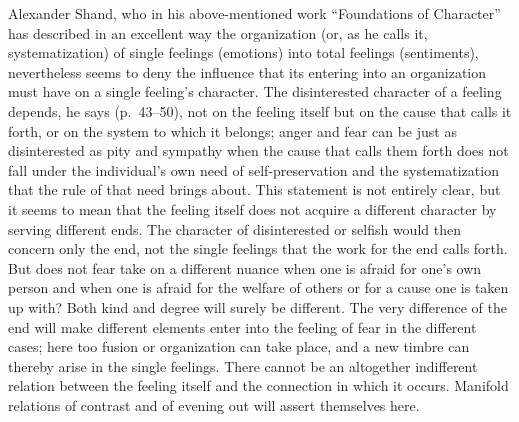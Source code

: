 \documentclass[12pt]{book}
\newcommand{\opage}[1]{\marginnote{\footnotesize\textit{[#1]}}}
\begin{document}
Alexander Shand, who in his above-mentioned work ``Foundations of Character'' has
described in an excellent way the organization (or, as he calls it,
systematization) of single feelings (emotions) into total feelings (sentiments),
nevertheless seems to deny the influence that its entering into an organization
must have on a single feeling's character. The disinterested character of a
feeling depends, he says (p.~43--50), not on the feeling itself but on the cause
that calls it forth, or on the system to which it belongs; anger and fear can be
just as disinterested as pity and sympathy when the cause that calls them forth
does not fall under the individual's own need of self-preservation and the
systematization that the rule of that need brings about. This statement is not
entirely clear, but it seems to mean that the feeling itself does not acquire a
different character by serving different ends. The character of disinterested or
selfish would then concern only the end, not the single feelings that the work
for the end calls forth. But does not fear take on a different \opage{32}nuance
when one is afraid for one's own person and when one is afraid for the welfare of
others or for a cause one is taken up with? Both kind and degree will surely be
different. The very difference of the end will make different elements enter into
the feeling of fear in the different cases; here too fusion or organization can
take place, and a new timbre can thereby arise in the single feelings. There
cannot be an altogether indifferent relation between the feeling itself and the
connection in which it occurs. Manifold relations of contrast and of evening out
will assert themselves here.
\end{document}
